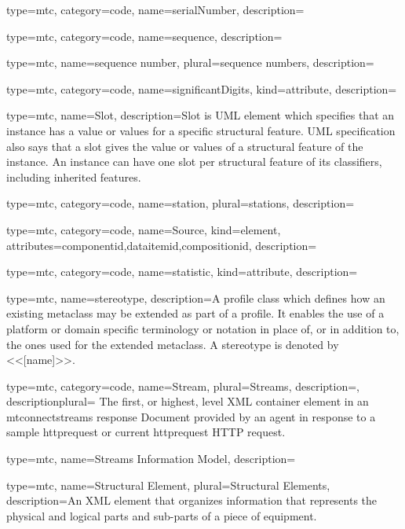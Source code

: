 {
  type=mtc,
  category=code,
  name={serialNumber},
  description={}
}


{
  type=mtc,
  category=code,
  name={sequence},
  description={}
}


{
  type=mtc,
  name={sequence number},
  plural={sequence numbers},
  description={}
}


{
  type=mtc,
  category=code,
  name={significantDigits},
  kind={attribute},
  description={}
}


{
  type=mtc,
  name=Slot,
  description={Slot is UML element which specifies that an instance has a value or values for a specific structural feature. UML specification also says that a slot gives the value or values of a structural feature of the instance. An instance can have one slot per structural feature of its classifiers, including inherited features.}
}


{
  type=mtc,
  category=code,
  name={station},
  plural={stations},
  description={}
}


{
  type=mtc,
  category=code,
  name={Source},
  kind={element},
  attributes={\gls{componentid},\gls{dataitemid},\gls{compositionid}},
  description={}
}


{
  type=mtc,
  category=code,
  name={statistic},
  kind={attribute},
  description={}
}


{
  type=mtc,
  name=stereotype,
  description={A profile class which defines how an existing metaclass may be extended as part of a profile. It enables the use of a platform or domain specific terminology or notation in place of, or in addition to, the ones used for the extended metaclass. A stereotype is denoted by <<[name]>>.}
}


{
  type=mtc,
  category=code,
  name={Stream},
  plural={Streams},
  description={},
  descriptionplural= {The first, or highest, level XML container element in an \glspl{mtconnectstream} \gls{response} Document provided by an \gls{agent} in response to a \gls{sample httprequest} or \gls{current httprequest} HTTP \gls{request}.}
}


{
  type=mtc,
  name={Streams Information Model},
  description={}
}


{
  type=mtc,
  name={Structural Element},
  plural={Structural Elements},
  description={An XML element that organizes information that represents the physical and logical parts and sub-parts of a piece of equipment.}
}


